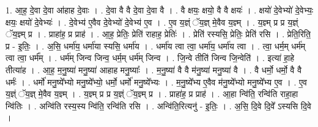 \documentclass[17pt]{extarticle}
\begin{document}
1. आ॒ह॒ दे॒वा दे॒वा आ॑हाह दे॒वाः । . दे॒वा वै वै दे॒वा दे॒वा वै । . वै क्षयः॒ क्षयो॒ वै वै क्षयः॑ । . क्षयो॑ दे॒वेभ्यो॑ दे॒वेभ्यः॒ क्षयः॒ क्षयो॑ दे॒वेभ्यः॑ । . दे॒वेभ्य॑ ए॒वैव दे॒वेभ्यो॑ दे॒वेभ्य॑ ए॒व । . ए॒व य॒ज्ञ्ं ॅय॒ज्ञ् मे॒वैव य॒ज्ञ्म् । . य॒ज्ञ्म् प्र प्र य॒ज्ञ्ं ॅय॒ज्ञ्म् प्र । . प्राहा॑ह॒ प्र प्राह॑ । . आ॒ह॒ प्रेतिः॒ प्रेति॑ राहाह॒ प्रेतिः॑ । . प्रेति॑ रस्यसि॒ प्रेतिः॒ प्रेति॑ रसि । . प्रेति॒रिति॒ प्र - इ॒तिः॒ । . अ॒सि॒ धर्मा॑य॒ धर्मा॑या स्यसि॒ धर्मा॑य । . धर्मा॑य त्वा त्वा॒ धर्मा॑य॒ धर्मा॑य त्वा । . त्वा॒ धर्म॒म् धर्म॑म् त्वा त्वा॒ धर्म᳚म् । . धर्म॑म् जिन्व जिन्व॒ धर्म॒म् धर्म॑म् जिन्व । . जि॒न्वे तीति॑ जिन्व जि॒न्वेति॑ । . इत्या॑ हा॒हे तीत्या॑ह । . आ॒ह॒ म॒नु॒ष्या॑ मनु॒ष्या॑ आहाह मनु॒ष्याः᳚ । . म॒नु॒ष्या॑ वै वै म॑नु॒ष्या॑ मनु॒ष्या॑ वै । . वै धर्मो॒ धर्मो॒ वै वै धर्मः॑ । . धर्मो॑ मनु॒ष्ये᳚भ्यो मनु॒ष्ये᳚भ्यो॒ धर्मो॒ धर्मो॑ मनु॒ष्ये᳚भ्यः । . म॒नु॒ष्ये᳚भ्य ए॒वैव म॑नु॒ष्ये᳚भ्यो मनु॒ष्ये᳚भ्य ए॒व । . ए॒व य॒ज्ञ्ं ॅय॒ज्ञ् मे॒वैव य॒ज्ञ्म् । . य॒ज्ञ्म् प्र प्र य॒ज्ञ्ं ॅय॒ज्ञ्म् प्र । . प्राहा॑ह॒ प्र प्राह॑ । . आ॒हा न्वि॑ति॒ रन्वि॑ति राहा॒हा न्वि॑तिः । . अन्वि॑ति रस्य॒स्य न्वि॑ति॒ रन्वि॑ति रसि । . अन्वि॑ति॒रित्यनु॑ - इ॒तिः॒ । . अ॒सि॒ दि॒वे दि॒वे᳚ ऽस्यसि दि॒वे । \newline
\end{document}
